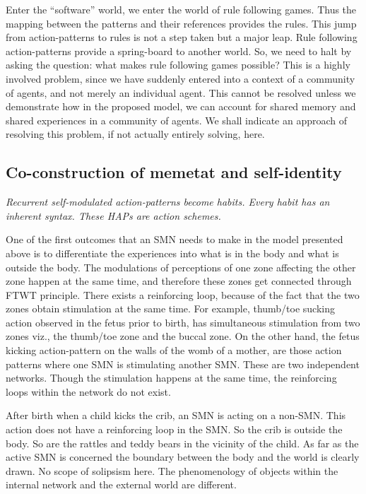 {{{{{Enter the ``software'' world, we enter the world of rule following games. Thus the mapping between the patterns and their references provides the rules. 
This jump from action-patterns to rules is not a step taken but a major leap. 
Rule following action-patterns provide a spring-board to another world. 
So, we need to halt by asking the question: what makes rule following games possible? 
This is a highly involved problem, since we have suddenly entered into a context of a community of agents, and not merely an individual agent. 
This cannot be resolved unless we demonstrate how in the proposed model, we can account for shared memory and shared experiences in a community of agents. 
We shall indicate an approach of resolving this problem, if not actually entirely solving, here. 

\subsection{Co-construction of memetat and self-identity}

\emph{Recurrent self-modulated action-patterns become habits. Every habit has an inherent syntax. These HAPs are \textit{action schemes}\cite{piaget1970genetic}.}

One of the first outcomes that an SMN needs to make in the model presented above is to differentiate the experiences into what is in the body and what is outside the body. 
The modulations of perceptions of one zone affecting the other zone happen at the same time, and therefore these zones get connected through FTWT principle. 
There exists a reinforcing loop, because of the fact that the two zones obtain stimulation at the same time. For example, thumb/toe sucking action observed in the fetus prior to birth, has simultaneous stimulation from two zones viz., the thumb/toe zone and the buccal zone. 
On the other hand, the fetus kicking action-pattern on the walls of the womb of a mother, are those action patterns where one SMN is stimulating another SMN. These are two independent networks. 
Though the stimulation happens at the same time, the reinforcing loops within the network do not exist. 

After birth when a child kicks the crib, an SMN is acting on a non-SMN. This action does not have a reinforcing loop in the SMN. So the crib is outside the body. So are the rattles and teddy bears in the vicinity of the child. 
As far as the active SMN is concerned the boundary between the body and the world is clearly drawn. No scope of solipsism here. The phenomenology of objects within the internal network and the external world are different. 

}}}}}
